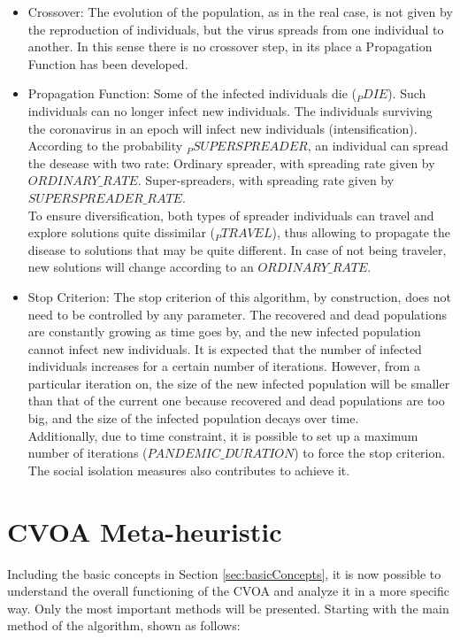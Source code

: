 \documentclass[letterpaper]{article}%
\begin{document}
\begin{itemize}
\item Crossover: The evolution of the population, as in the real case, is not given by the reproduction of individuals, but the virus spreads from one individual to another. In this sense there is no crossover step, in its place a Propagation Function has been developed.
\item Propagation Function:
Some of the infected individuals die ($_PDIE$). Such individuals can no longer infect new individuals.
The individuals surviving the coronavirus in an epoch will infect new individuals (intensification). According to the probability $_PSUPERSPREADER$, an individual can spread the desease with two rate:
\subitem Ordinary spreader, with spreading rate given by $ORDINARY\_RATE$.
\subitem Super-spreaders, with spreading rate given by $SUPERSPREADER\_RATE$.\\
To ensure diversification, both types of spreader individuals can travel and explore solutions quite dissimilar ($_PTRAVEL$), thus allowing to propagate the disease to solutions that may be quite different. In case of not being traveler, new solutions will change according to an $ORDINARY\_RATE$.
\item Stop Criterion:
The stop criterion of this algorithm, by construction, does not need to be controlled by any parameter. The recovered and dead populations are constantly growing as time goes by, and the new infected population cannot infect new individuals. It is expected that the number of infected individuals increases for a certain number of iterations. However, from a particular iteration on, the size of the new infected population will be smaller than that of the current one because recovered and dead populations are too big, and the size of the infected population decays over time. \\
Additionally, due to time constraint, it is possible to set up a maximum number of iterations ($PANDEMIC\_DURATION$) to force the stop criterion. The social isolation measures also contributes to achieve it.
\end{itemize}

\section{CVOA Meta-heuristic}
Including the basic concepts in Section \ref{sec:basicConcepts}, it is now possible to understand the overall functioning of the CVOA and analyze it in a more specific way.
Only the most important methods will be presented. Starting with the main method of the algorithm, shown as follows:
\end{document}
